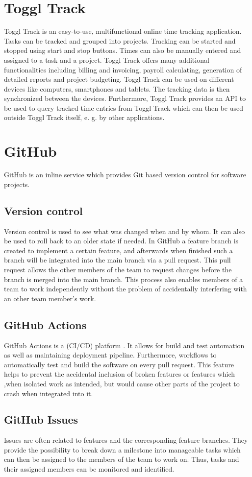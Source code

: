 \section{Toggl Track}
Toggl Track is an easy-to-use, multifunctional online time tracking application. Tasks can be tracked and grouped
into projects. Tracking can be started and stopped using start and stop buttons. Times can also be manually entered
and assigned to a task and a project. Toggl Track offers many additional functionalities including billing and invoicing,
payroll calculating, generation of detailed reports and project budgeting. Toggl Track can be used on different devices 
like computers, smartphones and tablets. The tracking data is then synchronized between the devices. Furthermore, Toggl 
Track provides an API to be used to query tracked time entries from Toggl Track which can then be used outside Toggl Track 
itself, e. g. by other applications. \cite{bachelorarbeit_Egger_Verstappen_page8} \cite{toggl_track_url}

\section{GitHub} \label{GitHub}
GitHub \cite{github_url} is an inline service which provides Git based version control for software projects.
\subsection{Version control}
Version control is used to see what was changed when and by whom. It can also be used to roll back to an older state if needed. In GitHub a feature branch is created to implement a certain feature, and afterwards when finished such a branch will be integrated into the main branch via a pull request. This pull request allows the other members of the team to request changes before the branch is merged into the main branch. This process also enables members of a team to work independently without the problem of accidentally interfering with an other team member's work.
\subsection{GitHub Actions}
GitHub Actions is a (CI/CD) platform \cite{github_actions_url}. It allows for build and test automation as well as maintaining deployment pipeline. Furthermore, workflows to automatically test and build the software on every pull request. This feature helps to prevent the accidental inclusion of broken features or features which ,when isolated work as intended, but would cause other parts of the project to crash when integrated into it.
\subsection{GitHub Issues}
Issues are often related to features and the corresponding feature branches. They provide the possibility to break down a milestone into manageable tasks which can then be assigned to the members of the team to work on. Thus, tasks and their assigned members can be monitored and identified. 
